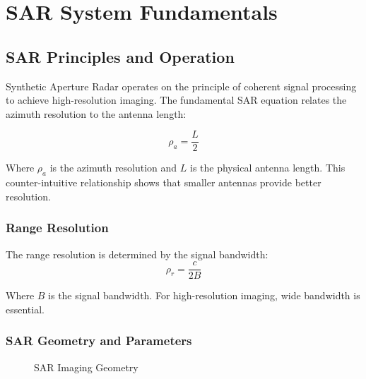\documentclass[12pt]{article}
\begin{document}
\section{SAR System Fundamentals}

\subsection{SAR Principles and Operation}

Synthetic Aperture Radar operates on the principle of coherent signal processing to achieve high-resolution imaging. The fundamental SAR equation relates the azimuth resolution to the antenna length:

\[\rho_a = \frac{L}{2}\]

Where $\rho_a$ is the azimuth resolution and $L$ is the physical antenna length. This counter-intuitive relationship shows that smaller antennas provide better resolution.

\subsubsection{Range Resolution}

The range resolution is determined by the signal bandwidth:
\[\rho_r = \frac{c}{2B}\]

Where $B$ is the signal bandwidth. For high-resolution imaging, wide bandwidth is essential.

\subsubsection{SAR Geometry and Parameters}

\begin{figure}[H]
\centering
{}
\caption{SAR Imaging Geometry}
\end{figure}
\end{document}
